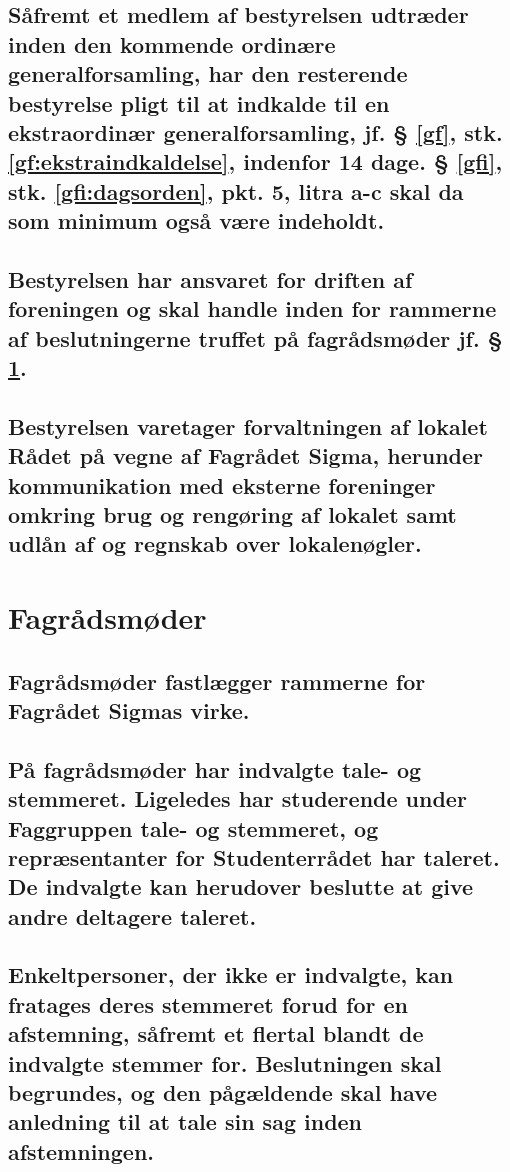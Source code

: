\documentclass[10pt]{article}
\begin{document}
	\subsection{Såfremt et medlem af bestyrelsen udtræder inden den kommende ordinære generalforsamling, har den resterende bestyrelse pligt til at indkalde til en ekstraordinær generalforsamling, jf. § \ref{gf}, stk. \ref{gf:ekstraindkaldelse}, indenfor 14 dage. § \ref{gfi}, stk. \ref{gfi:dagsorden}, pkt. 5, litra a-c skal da som minimum også være indeholdt.}
	
	\subsection{Bestyrelsen har ansvaret for driften af foreningen og skal handle inden for rammerne af beslutningerne truffet på fagrådsmøder jf. § \ref{FRM}.}
	
	\subsection{Bestyrelsen varetager forvaltningen af lokalet Rådet på vegne af Fagrådet Sigma, herunder kommunikation med eksterne foreninger omkring brug og rengøring af lokalet samt udlån af og regnskab over lokalenøgler.}
	
	\section{Fagrådsmøder}\label{FRM}
	
	\subsection{Fagrådsmøder fastlægger rammerne for Fagrådet Sigmas virke.}\label{FRM:daglig}
	
	\subsection{På fagrådsmøder har indvalgte tale- og stemmeret. Ligeledes har studerende under Faggruppen tale- og stemmeret, og repræsentanter for Studenterrådet har taleret. De indvalgte kan herudover beslutte at give andre deltagere taleret.}\label{FRM:stemmeret}
	
	\subsection{Enkeltpersoner, der ikke er indvalgte, kan fratages deres stemmeret forud for en afstemning, såfremt et flertal blandt de indvalgte stemmer for. Beslutningen skal begrundes, og den pågældende skal have anledning til at tale sin sag inden afstemningen.}
	
\end{document}

